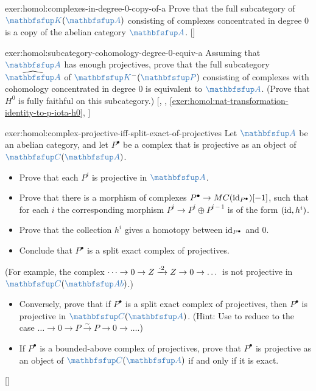 \begin{exer}{\exerused{}}{exer:homol:complexes-in-degree-0-copy-of-a}
  Prove that the full subcategory of $\categ{K}(\categ{A})$ consisting
  of complexes concentrated in degree $0$ is a copy of the abelian
  category $\categ{A}$. []
\end{exer}
\begin{exer}{\exerused{}}{exer:homol:subcategory-cohomology-degree-0-equiv-a}
  Assuming that $\categ{A}$ has enough projectives, prove that the
  full subcategory $\widehat{\categ{A}}$ of $\categ{K}^-(\categ{P})$
  consisting of complexes with cohomology concentrated in degree $0$
  is equivalent to $\categ{A}$. (Prove that $H^0$ is fully faithful on
  this subcategory.) [,
  ,
  \ref{exer:homol:nat-transformation-identity-to-p-iota-h0},
  ]
\end{exer}
\begin{exer}{\exerused{}}{exer:homol:complex-projective-iff-split-exact-of-projectives}
  Let $\categ{A}$ be an abelian category, and let $P^\bullet$ be a
  complex that is projective as an object of $\categ{C}(\categ{A})$.
  \begin{itemize}
  \item Prove that each $P^i$ is projective in $\categ{A}$.
  \item Prove that there is a morphism of complexes
    $P^\bullet \to MC(\operatorname{id}_{P^\bullet})[-1]$, such that for each $i$
    the corresponding morphism $P^i \to P^i \oplus P^{i-1}$ is of the
    form $(\operatorname{id}, h^i)$.
  \item Prove that the collection $h^i$ gives a homotopy between
    $\operatorname{id}_{P^\bullet}$ and $0$.
  \item Conclude that $P^\bullet$ is a split exact complex of
    projectives.
  \end{itemize}
  (For example, the complex
  $\dots \to 0 \to Z \xrightarrow{\cdot 2} Z \to 0 \to \dots$ is not
  projective in $\categ{C}(\categ{Ab})$.)
  \begin{itemize}
  \item Conversely, prove that if $P^\bullet$ is a split exact complex
    of projectives, then $P^\bullet$ is projective in
    $\categ{C}(\categ{A})$. (Hint: Use
    to reduce to the case
    $\dots \to 0 \to P \xrightarrow{\sim} P \to 0 \to \dots$.)
  \item If $P^\bullet$ is a bounded-above complex of projectives,
    prove that $P^\bullet$ is projective as an object of
    $\categ{C}(\categ{A})$ if and only if it is exact.
  \end{itemize} []
\end{exer}
